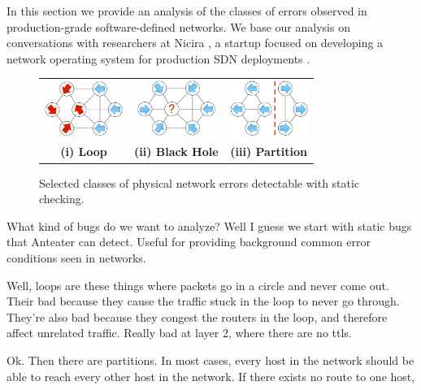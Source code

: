 
In this section we provide an analysis of the classes of errors observed in
production-grade software-defined networks. We base our analysis on conversations with
researchers at Nicira \cite{Nicira}, a startup focused on developing a network operating
system for production SDN deployments \cite{Onix}.

\begin{figure}[t]
    \centering
    \begin{tabular}{ccc}
    \hspace{-3pt}\includegraphics[width=1in]{../diagrams/bugs/loop.pdf}&
    \includegraphics[width=1in]{../diagrams/bugs/dead_end.pdf}&
    \includegraphics[width=1in]{../diagrams/bugs/partition.pdf}\\
    {\bf (i) Loop}&{\bf (ii) Black Hole}&{\bf (iii) Partition}\\
    \end{tabular}
    \caption[]{\label{fig:loop} Selected classes of physical network errors detectable with static
    checking.\vspace{-10pt}} 
\end{figure}


What kind of bugs do we want to analyze? Well I guess we start with static
bugs that Anteater can detect. Useful for providing background common error
conditions seen in networks. 

Well, loops are these things where packets go in a circle and never come out.
Their bad because they cause the traffic stuck in the loop to never go
through. They're also bad because they congest the routers in the loop, and
therefore affect unrelated traffic. Really bad at layer 2, where there are no
ttls.

Ok. Then there are partitions. In most cases, every host in the network should
be able to reach every other host in the network. If there exists no route to
one host, 


